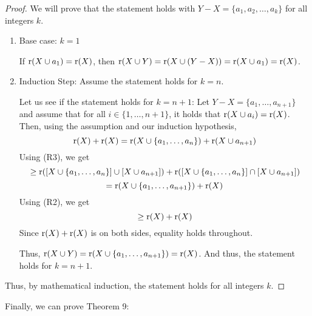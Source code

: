\begin{proof}
    We will prove that the statement holds with $Y-X = \{a_1,a_2,\dots,a_k\}$ for all integers $k$.
    \begin{enumerate}
        \item Base case: $k=1$

        If $\operatorname{r}(X\cup a_1)=\operatorname{r}(X)$, then $\operatorname{r}(X\cup Y)=\operatorname{r}(X\cup(Y-X))=\operatorname{r}(X\cup a_1)=\operatorname{r}(X)$.
        \item Induction Step: Assume the statement holds for $k=n$. 
        
        Let us see if the statement holds for $k=n+1$: Let $Y-X=\{a_1,\dots,a_{n+1}\}$ and assume that for all $i\in\{1,\dots,n+1\}$, it holds that $\operatorname{r}(X\cup a_i)=\operatorname{r}(X)$. Then, using the assumption and our induction hypothesis, 
        $$ \operatorname{r}(X)+\operatorname{r}(X) = \operatorname{r}(X\cup \{a_1,\dots,a_n\})+\operatorname{r}(X\cup a_{n+1}) $$
        Using (R3), we get
        $$ \geq \operatorname{r}([X\cup\{a_1,\dots,a_n\}]\cup [X\cup a_{n+1}]) + \operatorname{r}([X\cup\{a_1,\dots,a_n\}]\cap [X\cup a_{n+1}]) $$
        $$ = \operatorname{r}(X\cup\{a_1,\dots,a_{n+1}\}) + \operatorname{r}(X) $$
        Using (R2), we get
        $$ \geq \operatorname{r}(X)+\operatorname{r}(X) $$
        Since $\operatorname{r}(X)+\operatorname{r}(X)$ is on both sides, equality holds throughout. 
        
        Thus, $\operatorname{r}(X\cup Y) = \operatorname{r}(X\cup\{a_1,\dots,a_{n+1}\})=\operatorname{r}(X)$. And thus, the statement holds for $k=n+1$.
    \end{enumerate}
    Thus, by mathematical induction, the statement holds for all integers $k$.
\end{proof}
Finally, we can prove Theorem 9:
